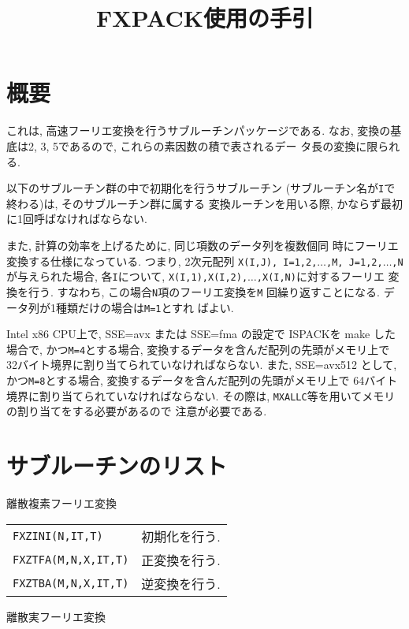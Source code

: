 \documentclass[a4j]{jsarticle}
\title{FXPACK使用の手引}
\author{}
\date{}
\begin{document}
\maketitle

\section{概要}

これは, 高速フーリエ変換を行うサブルーチンパッケージである.
なお, 変換の基底は2, 3, 5であるので, これらの素因数の積で表されるデー
タ長の変換に限られる.

以下のサブルーチン群の中で初期化を行うサブルーチン
(サブルーチン名が\texttt{I}で終わる)は, そのサブルーチン群に属する
変換ルーチンを用いる際, かならず最初に1回呼ばなければならない. 

また, 計算の効率を上げるために, 同じ項数のデータ列を複数個同
時にフーリエ変換する仕様になっている. つまり, 2次元配列
\texttt{X(I,J), I=1,2,$\ldots$,M, J=1,2,$\ldots$,N}が与えられた場合, 
各\texttt{I}について, \texttt{X(I,1),X(I,2),$\ldots$,X(I,N)}に対するフーリエ
変換を行う. すなわち, この場合\texttt{N}項のフーリエ変換を\texttt{M}
回繰り返すことになる. データ列が1種類だけの場合は\texttt{M=1}とすれ
ばよい.

Intel x86 CPU上で, SSE=avx または SSE=fma の設定で ISPACKを
make した場合で, かつ\texttt{M=4}とする場合, 
変換するデータを含んだ配列の先頭がメモリ上で 
32バイト境界に割り当てられていなければならない.
また, SSE=avx512 として, かつ\texttt{M=8}とする場合, 
変換するデータを含んだ配列の先頭がメモリ上で 
64バイト境界に割り当てられていなければならない.
その際は,
\texttt{MXALLC}等を用いてメモリの割り当てをする必要があるので
注意が必要である.

\section{サブルーチンのリスト}

  離散複素フーリエ変換

  \vspace{1ex}
  \begin{tabular}{ll}
    \texttt{FXZINI(N,IT,T)} & 初期化を行う.\\
    \texttt{FXZTFA(M,N,X,IT,T)} & 正変換を行う.\\
    \texttt{FXZTBA(M,N,X,IT,T)} & 逆変換を行う.
  \end{tabular}

 \vspace{1ex}
  離散実フーリエ変換
\end{document}
